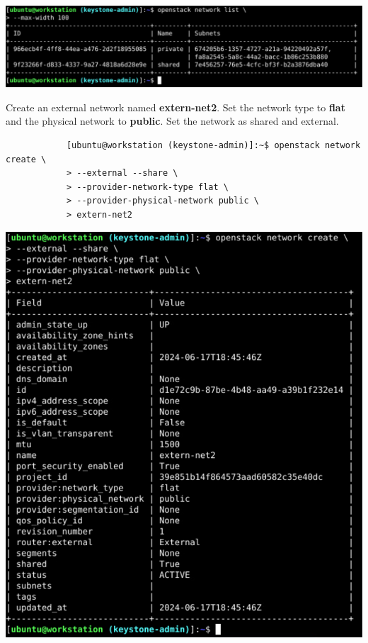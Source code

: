 \documentclass[letterpaper, 12pt]{article}
\begin{document}
\begin{enumerate}
\begin{labstep}
        \begin{center}
            \includegraphics[width=\linewidth]{images/part1/step14.png}
        \end{center}
    \end{labstep}

    \begin{labstep}
        Create an external network named \textbf{extern-net2}.
        Set the network type to \textbf{flat} and the physical network to \textbf{public}.
        Set the network as shared and external.
        \begin{lstlisting}
            [ubuntu@workstation (keystone-admin)]:~$ openstack network create \
            > --external --share \
            > --provider-network-type flat \
            > --provider-physical-network public \
            > extern-net2
        \end{lstlisting}

        \begin{center}
            \includegraphics[width=\linewidth]{images/part1/step15.png}
        \end{center}
    \end{labstep}


\end{enumerate}
\end{document}
